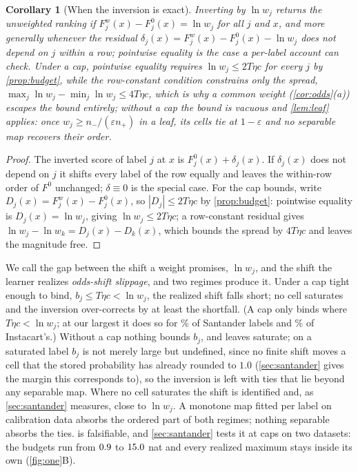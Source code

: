 \documentclass[sigconf,nonacm]{acmart}
\newtheorem{corollary}{Corollary}
\begin{document}
\begin{corollary}[When the inversion is exact]
\label{cor:exact}
Inverting by $\ln w_j$ returns the unweighted ranking if $F^{w}_j(x)-F^{0}_j(x)=\ln w_j$ for all $j$ and $x$, and more generally whenever the residual $\delta_j(x)=F^{w}_j(x)-F^{0}_j(x)-\ln w_j$ does not depend on $j$ within a row; pointwise equality is the case a per-label account can check. Under a cap, pointwise equality requires $\ln w_j\le 2T\eta c$ for every $j$ by \cref{prop:budget}, while the row-constant condition constrains only the spread, $\max_j\ln w_j-\min_j\ln w_j\le 4T\eta c$, which is why a common weight (\cref{cor:odds}(a)) escapes the bound entirely; without a cap the bound is vacuous and \cref{lem:leaf} applies: once $w_j\ge n_-/(\varepsilon n_+)$ in a leaf, its cells tie at $1-\varepsilon$ and no separable map recovers their order.
\end{corollary}
\begin{proof}
The inverted score of label $j$ at $x$ is $F^{0}_j(x)+\delta_j(x)$. If $\delta_j(x)$ does not depend on $j$ it shifts every label of the row equally and leaves the within-row order of $F^{0}$ unchanged; $\delta\equiv0$ is the special case. For the cap bounds, write $D_j(x)=F^{w}_j(x)-F^{0}_j(x)$, so $|D_j|\le 2T\eta c$ by \cref{prop:budget}: pointwise equality is $D_j(x)=\ln w_j$, giving $\ln w_j\le 2T\eta c$; a row-constant residual gives $\ln w_j-\ln w_k=D_j(x)-D_k(x)$, which bounds the spread by $4T\eta c$ and leaves the magnitude free.
\end{proof}

We call the gap between the shift a weight promises, $\ln w_j$, and the shift the learner realizes \emph{odds-shift slippage}, and two regimes produce it. Under a cap tight enough to bind, $b_j\le T\eta c<\ln w_j$, the realized shift falls short; no cell saturates and the inversion over-corrects by at least the shortfall. (A cap only binds where $T\eta c<\ln w_j$; at our largest it does so for \nSmdsFivefracLnwAbove\% of Santander labels and \nISmdsFivefracLnwAbove\% of Instacart's.) Without a cap nothing bounds $b_j$, and leaves saturate; on a saturated label $b_j$ is not merely large but undefined, since no finite shift moves a cell that the stored probability has already rounded to $1.0$ (\cref{sec:santander} gives the margin this corresponds to), so the inversion is left with ties that lie beyond any separable map. Where no cell saturates the shift is identified and, as \cref{sec:santander} measures, close to $\ln w_j$. A monotone map fitted per label on calibration data absorbs the ordered part of both regimes; nothing separable absorbs the ties.  is falsifiable, and \cref{sec:santander} tests it at \ncapN{} caps on two datasets: the budgets run from $0.9$ to $15.0$ nat and every realized maximum stays inside its own (\cref{fig:one}B).
\end{document}
